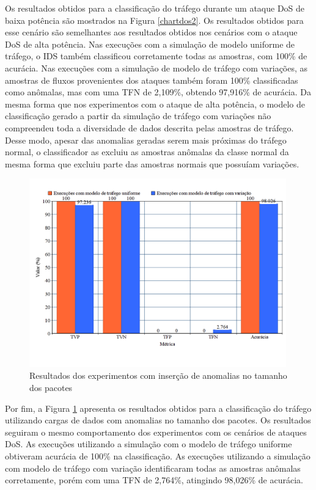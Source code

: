 \documentclass[cic,tc]{iiufrgs}
\begin{document}
Os resultados obtidos para a classificação do tráfego durante um ataque DoS de baixa potência são mostrados na Figura \ref{chartdos2}. Os resultados obtidos para esse cenário são semelhantes aos resultados obtidos nos cenários com o ataque DoS de alta potência. Nas execuções com a simulação de modelo uniforme de tráfego, o IDS também classificou corretamente todas as amostras, com 100\% de acurácia. Nas execuções com a simulação de modelo de tráfego com variações, as amostras de fluxos provenientes dos ataques também foram 100\% classificadas como anômalas, mas com uma TFN de 2,109\%, obtendo 97,916\% de acurácia. Da mesma forma que nos experimentos com o ataque de alta potência, o modelo de classificação gerado a partir da simulação de tráfego com variações não compreendeu toda a diversidade de dados descrita pelas amostras de tráfego. Desse modo, apesar das anomalias geradas serem mais próximas do tráfego normal, o classificador as excluiu as amostras anômalas da classe normal da mesma forma que excluiu parte das amostras normais que possuíam variações.

\begin{figure}[h]
   \caption{Resultados dos experimentos com inserção de anomalias no tamanho dos pacotes}
   \begin{center}
       \includegraphics[width=30em]{chartsize}
   \end{center}
   \label{chartsize}
\end{figure}

Por fim, a Figura \ref{chartsize} apresenta os resultados obtidos para a classificação do tráfego utilizando cargas de dados com anomalias no tamanho dos pacotes. Os resultados seguiram o mesmo comportamento dos experimentos com os cenários de ataques DoS. As execuções utilizando a simulação com o modelo de tráfego uniforme obtiveram acurácia de 100\% na classificação. As execuções utilizando a simulação com modelo de tráfego com variação identificaram todas as amostras anômalas corretamente, porém com uma TFN de 2,764\%, atingindo 98,026\% de acurácia.
\end{document}
